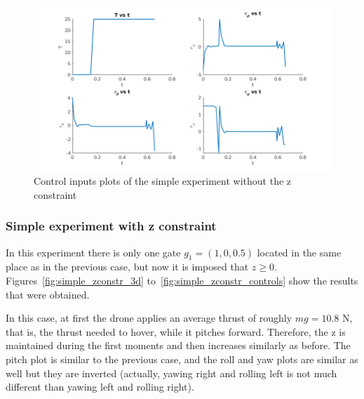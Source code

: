 \documentclass[letterpaper, 10 pt, conference]{ieeeconf}  %
\begin{document}
\begin{figure}[!htpb]
	\centering
	\includegraphics[width=1.0\linewidth]{Images/simple_zfree/controls.png}
	\caption{Control inputs plots of the simple experiment without the z constraint}
	\label{fig:simple_zfree_controls}
\end{figure}

\subsubsection{Simple experiment with z constraint}

In this experiment there is only one gate $g_1=(1, 0, 0.5)$ located in the same place as in the previous case, but now it is imposed that $ z \ge 0$. Figures~\ref{fig:simple_zconstr_3d} to~\ref{fig:simple_zconstr_controls} show the results that were obtained.

In this case, at first the drone applies an average thrust of roughly $mg = 10.8$ N, that is, the thrust needed to hover, while it pitches forward. Therefore, the z is maintained during the first moments and then increases similarly as before. The pitch plot is similar to the previous case, and the roll and yaw plots are similar as well but they are inverted (actually, yawing right and rolling left is not much different than yawing left and rolling right).
\end{document}
